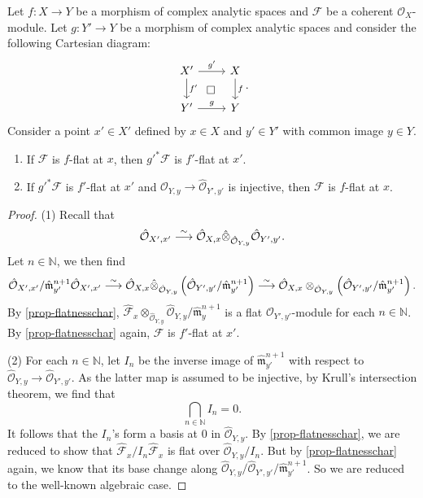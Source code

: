 \begin{proposition}\label{prop-flatmorphismbasechange}
    Let $f:X\rightarrow Y$ be a morphism of complex analytic spaces and $\mathcal{F}$ be a coherent $\mathcal{O}_X$-module. Let $g:Y'\rightarrow Y$ be a morphism of complex analytic spaces and consider the following Cartesian diagram:
    \[
        \begin{tikzcd}
            X' \arrow[r,"g'"] \arrow[d, "f'"] \arrow[rd, "\square", phantom] & X \arrow[d, "f"] \\
            Y' \arrow[r,"g"]                                                & Y               
        \end{tikzcd}.  
    \]
    Consider a point $x'\in X'$ defined by $x\in X$ and $y'\in Y'$ with common image $y\in Y$. 
    \begin{enumerate}
        \item If $\mathcal{F}$ is $f$-flat at $x$, then $g'^{*}\mathcal{F}$ is $f'$-flat at $x'$.
        \item If $g'^*\mathcal{F}$ is $f'$-flat at $x'$ and $\hat{\mathcal{O}}_{Y,y}\rightarrow \hat{\mathcal{O}}_{Y',y'}$ is injective, then $\mathcal{F}$ is $f$-flat at $x$.
    \end{enumerate}
\end{proposition}
\begin{proof}
    (1) Recall that
    \[
        \hat{\mathcal{O}}_{X',x'}\stackrel{\sim}{\longrightarrow}   \hat{\mathcal{O}}_{X,x}\hat{\otimes}_{\hat{\mathcal{O}}_{Y,y}}\hat{\mathcal{O}}_{Y',y'}.
    \]
    Let $n\in \mathbb{N}$, we then find
    \[
        \hat{\mathcal{O}}_{X',x'}/\hat{\mathfrak{m}}_{y'}^{n+1}\hat{\mathcal{O}}_{X',x'}\stackrel{\sim}{\longrightarrow}   \hat{\mathcal{O}}_{X,x}\hat{\otimes}_{\hat{\mathcal{O}}_{Y,y}}\left(\hat{\mathcal{O}}_{Y',y'}/\hat{\mathfrak{m}}_{y'}^{n+1}\right)\stackrel{\sim}{\longrightarrow}  \hat{\mathcal{O}}_{X,x}\otimes_{\hat{\mathcal{O}}_{Y,y}}\left(\hat{\mathcal{O}}_{Y',y'}/\hat{\mathfrak{m}}_{y'}^{n+1}\right).
    \]
    By \cref{prop-flatnesschar}, $\hat{\mathcal{F}}_x\otimes_{\hat{\mathcal{O}}_{Y,y}}\hat{\mathcal{O}}_{Y,y}/\hat{\mathfrak{m}}_y^{n+1}$ is a flat $\mathcal{O}_{Y',y'}$-module for each $n\in \mathbb{N}$. By \cref{prop-flatnesschar} again, $\mathcal{F}$ is $f'$-flat at $x'$.

    (2) For each $n\in \mathbb{N}$, let $I_n$ be the inverse image of $\hat{\mathfrak{m}}_{y'}^{n+1}$ with respect to $\hat{\mathcal{O}}_{Y,y}\rightarrow \hat{\mathcal{O}}_{Y',y'}$. As the latter map is assumed to be injective, by Krull's intersection theorem, we find that
    \[
        \bigcap_{n\in \mathbb{N}}I_n=0.  
    \]
    It follows that the $I_n$'s form a basis at $0$ in $\hat{\mathcal{O}}_{Y,y}$. By \cref{prop-flatnesschar}, we are reduced to show that $\hat{\mathcal{F}}_x/I_n\hat{\mathcal{F}}_x$ is flat over $\hat{\mathcal{O}}_{Y,y}/I_n$. But by \cref{prop-flatnesschar} again, we know that its base change along $\hat{\mathcal{O}}_{Y,y}/\hat{\mathcal{O}}_{Y',y'}/\hat{\mathfrak{m}}_{y'}^{n+1}$. So we are reduced to the well-known algebraic case.
\end{proof}

